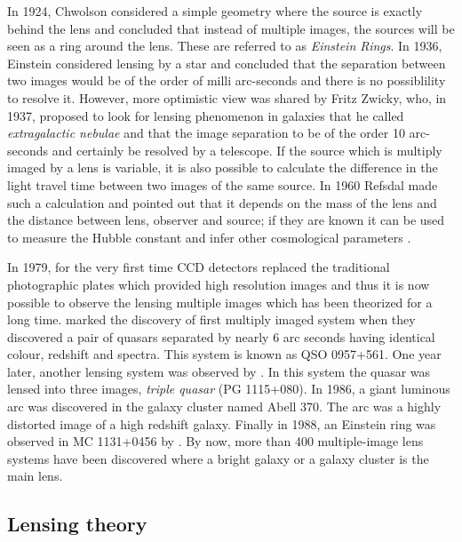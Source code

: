 In 1924, Chwolson
considered a simple geometry where the source is exactly behind the lens
and concluded that instead of multiple images, the sources will be seen
as a ring around the lens. These are referred to as {\it Einstein Rings}.
In 1936, Einstein
considered lensing by a star and concluded that the separation between two images
would be of the order of milli arc-seconds and there is no possiblility to
resolve it. However, more optimistic view was shared by Fritz Zwicky, who, in 1937,
proposed to look for lensing phenomenon in galaxies that he called 
{\it extragalactic nebulae} and that the image separation to be of the order 10 arc-seconds
and certainly be resolved by a telescope. If the source which is multiply imaged
by a lens is variable, it is also possible to calculate the difference 
in the light travel time between two images of the same source. In 1960 Refsdal
made such a calculation and pointed out that it depends on the mass of the lens
and the distance between lens, observer and source; if they are known it can be 
used to measure the Hubble constant and infer other cosmological parameters
\cite{2004tomu.conf..231R}. 



In 1979, for the very first time CCD detectors replaced the traditional photographic
plates which provided high resolution 
images and thus it is now possible to observe the lensing multiple images
which has been theorized for a long time. \cite{1979Natur.279..381W} marked
the discovery of first multiply imaged system when they discovered a pair of quasars
separated by nearly 6 arc seconds having identical colour, redshift and spectra. This
system is known as QSO 0957+561. One year later, another lensing system was observed
by \cite{1980Natur.285..641W}. In this system the quasar was lensed into three
images, {\it triple quasar} (PG 1115+080). In 1986, a giant luminous
arc was discovered in the galaxy cluster named Abell 370. The arc
was a highly distorted image of a high redshift galaxy. Finally in 1988, an Einstein
ring was observed in MC 1131+0456 by \cite{1988Natur.333..537H}. By now, more than 
400 multiple-image lens systems have been discovered where a bright galaxy
or a galaxy cluster is the main lens. 





\subsection{Lensing theory}


